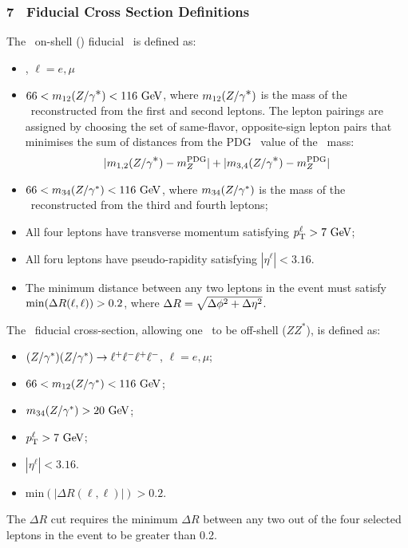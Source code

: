 \subsubsection{7 \tev\ Fiducial Cross Section Definitions}

The \zzllll\ on-shell (\ZZ) fiducial \cx\ is defined as:

\begin{itemize}
\item{\ZorgZorglplmlplm, $\ell = e,\mu$}
\item{ $66 < m_{12}(\Zorgv) <  116\GeV$, where $m_{12}(Z/\gamma^{\textstyle *})$ is
the mass of the \Z\ reconstructed from the first and second leptons.  The
lepton pairings are assigned by choosing the set of 
same-flavor, opposite-sign lepton pairs that minimises the sum of distances from
the PDG~\cite{PDG} value of the \Z\ mass:
\begin{equation}
|m_{1,2}(Z/\gamma^{\textstyle *}) - m_{Z}^{\rm PDG}| + |m_{3,4}(Z/\gamma^{\textstyle *}) - m_{Z}^{\rm PDG}|
\end{equation}
}
\item{ $66 < m_{34}(\Z/\gamma^*) <  116\GeV$, where $m_{34}(Z/\gamma^*)$ is
the mass of the \Z\ reconstructed from the third and fourth leptons;}
\item All four leptons have transverse momentum satisfying $\pT^{\ell} > 7\GeV$;
\item All foru leptons have pseudo-rapidity satisfying $|\eta^{\ell}| < 3.16$.
\item{ The minimum distance between any two leptons in the event must satisfy
$\mathrm{min}(\Delta R(\ell,\ell)) > 0.2$, where $\Delta R = \sqrt{\Delta \phi^{2} +
\Delta \eta^{2}}$.}
\end{itemize}

The \zzllll\ fiducial cross-section, allowing one \Z\ to be off-shell ($ZZ^*$), is defined as:

\begin{itemize}
\item $(Z/\gamma^*)(Z/\gamma^*)\rightarrow\ell^+ \ell^-\ell^+ \ell^-$, $\ell = e,\mu$;
\item $66 < m_{12}(\Z/\gamma^*) <  116\GeV$;
\item $m_{34}(\Z/\gamma^*) > 20\GeV$;
\item $\pT^{\ell} > 7\GeV$;
\item $|\eta^{\ell}| < 3.16$.
\item $\mathrm{min}(|\Delta R(\ell,\ell)|) > 0.2$.
\end{itemize}

The $\Delta R$ cut requires the minimum $\Delta R$ between any two out of the
four selected leptons in the event to be greater than 0.2.

